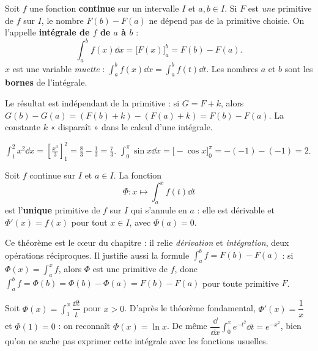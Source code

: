 \begin{definition}
Soit $f$ une fonction \textbf{continue} sur un intervalle $I$ et $a,b\in I$. Si $F$ est
\emph{une} primitive de $f$ sur $I$, le nombre $F(b)-F(a)$ ne dépend pas de la primitive choisie.
On l'appelle \textbf{intégrale de $f$ de $a$ à $b$} :
\[
\int_a^b f(x)\dd x=\big[F(x)\big]_a^b=F(b)-F(a).
\]
$x$ est une variable \emph{muette} : $\displaystyle\int_a^b f(x)\dd x=\int_a^b f(t)\dd t$.
Les nombres $a$ et $b$ sont les \textbf{bornes} de l'intégrale.
\end{definition}

\begin{remarque}
Le résultat est indépendant de la primitive : si $G=F+k$, alors $G(b)-G(a)=(F(b)+k)-(F(a)+k)=F(b)-F(a)$.
La constante $k$ « disparaît » dans le calcul d'une intégrale.
\end{remarque}

\begin{exemple}
$\displaystyle\int_1^2 x^2\dd x=\left[\frac{x^3}{3}\right]_1^2=\frac{8}{3}-\frac13=\frac{7}{3}$.\;
$\displaystyle\int_0^{\pi}\sin x\dd x=\big[-\cos x\big]_0^{\pi}=-(-1)-(-1)=2$.
\end{exemple}

\begin{theoreme}
Soit $f$ continue sur $I$ et $a\in I$. La fonction
\[
\Phi:x\longmapsto\int_a^x f(t)\dd t
\]
est l'\textbf{unique} primitive de $f$ sur $I$ qui s'annule en $a$ : elle est dérivable et
$\Phi'(x)=f(x)$ pour tout $x\in I$, avec $\Phi(a)=0$.
\end{theoreme}

\begin{remarque}
Ce théorème est le cœur du chapitre : il relie \emph{dérivation} et \emph{intégration}, deux
opérations réciproques. Il justifie aussi la formule $\int_a^b f=F(b)-F(a)$ : si $\Phi(x)=\int_a^x f$,
alors $\Phi$ est une primitive de $f$, donc $\int_a^b f=\Phi(b)=\Phi(b)-\Phi(a)=F(b)-F(a)$ pour
toute primitive $F$.
\end{remarque}

\begin{exemple}
Soit $\Phi(x)=\displaystyle\int_1^x \dfrac{\dd t}{t}$ pour $x>0$. D'après le théorème fondamental,
$\Phi'(x)=\dfrac1x$ et $\Phi(1)=0$ : on reconnaît $\Phi(x)=\ln x$. De même
$\dfrac{\dd}{\dd x}\displaystyle\int_0^x e^{-t^2}\dd t=e^{-x^2}$, bien qu'on ne sache pas exprimer
cette intégrale avec les fonctions usuelles.
\end{exemple}

